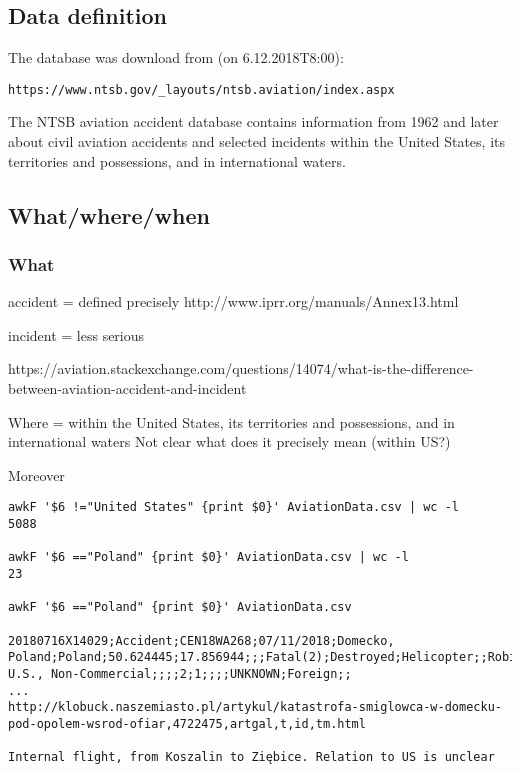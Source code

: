 \documentclass{article}
\begin{document}
\subsection{Data definition}\label{data-definition}

The database was download from (on 6.12.2018T8:00):

\begin{verbatim}
https://www.ntsb.gov/_layouts/ntsb.aviation/index.aspx
\end{verbatim}

The NTSB aviation accident database contains information from 1962 and
later about civil aviation accidents and selected incidents within the
United States, its territories and possessions, and in international
waters.

\subsection{What/where/when}\label{whatwherewhen}

\subsubsection{What}\label{what}

accident = defined precisely http://www.iprr.org/manuals/Annex13.html

incident = less serious

https://aviation.stackexchange.com/questions/14074/what-is-the-difference-between-aviation-accident-and-incident

Where = within the United States, its territories and possessions, and
in international waters Not clear what does it precisely mean (within
US?)

Moreover

\begin{verbatim}
awkF '$6 !="United States" {print $0}' AviationData.csv | wc -l
5088

awkF '$6 =="Poland" {print $0}' AviationData.csv | wc -l
23

awkF '$6 =="Poland" {print $0}' AviationData.csv

20180716X14029;Accident;CEN18WA268;07/11/2018;Domecko, Poland;Poland;50.624445;17.856944;;;Fatal(2);Destroyed;Helicopter;;Robinson;R44;No;1;Reciprocating;Non-U.S., Non-Commercial;;;;2;1;;;;UNKNOWN;Foreign;;
...
http://klobuck.naszemiasto.pl/artykul/katastrofa-smiglowca-w-domecku-pod-opolem-wsrod-ofiar,4722475,artgal,t,id,tm.html

Internal flight, from Koszalin to Ziębice. Relation to US is unclear
\end{verbatim}
\end{document}

